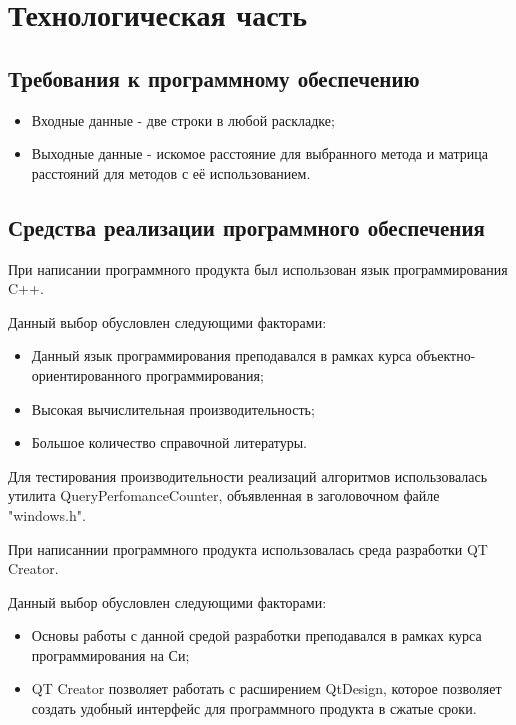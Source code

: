 \documentclass[12pt]{report}
\begin{document}
\chapter{Технологическая часть}
\section{Требования к программному обеспечению}
\begin{itemize}
\item Входные данные - две строки в любой раскладке;
\item Выходные данные - искомое расстояние для выбранного метода и матрица расстояний для методов с её использованием.
\end{itemize}
\section{Средства реализации программного обеспечения}
При написании программного продукта был использован язык программирования C++.

Данный выбор обусловлен следующими факторами:
\begin{itemize}
\item Данный язык программирования преподавался в рамках курса объектно-ориентированного программирования;
\item Высокая вычислительная производительность;
\item Большое количество справочной литературы.
\end{itemize}

Для тестирования производительности реализаций алгоритмов использовалась утилита QueryPerfomanceCounter, объявленная в заголовочном файле "windows.h".

При написаннии программного продукта использовалась среда разработки QT Creator.

Данный выбор обусловлен следующими факторами:
\begin{itemize}
\item Основы работы с данной средой разработки преподавался в рамках курса программирования на Си;
\item QT Creator позволяет работать с расширением QtDesign, которое позволяет создать удобный интерфейс для программного продукта в сжатые сроки.
\end{itemize}
\end{document}
